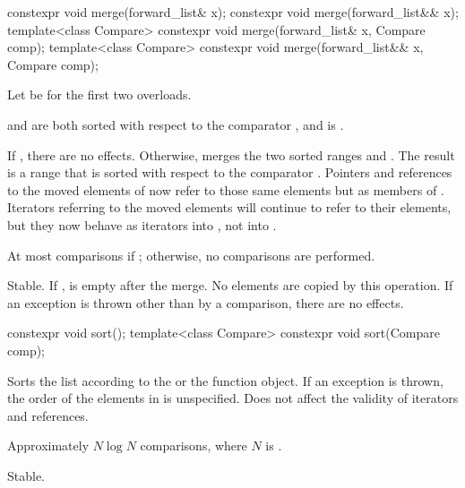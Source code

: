%
\begin{itemdecl}
constexpr void merge(forward_list& x);
constexpr void merge(forward_list&& x);
template<class Compare> constexpr void merge(forward_list& x, Compare comp);
template<class Compare> constexpr void merge(forward_list&& x, Compare comp);
\end{itemdecl}

\begin{itemdescr}
\pnum
Let  be  for the first two overloads.

\pnum
\expects
{} and  are both sorted
with respect to the comparator , and
 is .

\pnum
\effects
If , there are no effects.
Otherwise, merges
the two sorted ranges  and .
The result is a range
that is sorted with respect to the comparator .
Pointers and references to the moved elements of  now refer to those same elements
but as members of . Iterators referring to the moved elements will continue to
refer to their elements, but they now behave as iterators into , not into
.

\pnum
\complexity
At most  comparisons
if ; otherwise, no comparisons are performed.

\pnum
\remarks
Stable.
If ,  is empty after the merge.
No elements are copied by this operation.
If an exception is thrown other than by a comparison, there are no effects.
\end{itemdescr}

%
\begin{itemdecl}
constexpr void sort();
template<class Compare> constexpr void sort(Compare comp);
\end{itemdecl}

\begin{itemdescr}
\pnum
\effects
Sorts the list according to the  or the  function object.
If an exception is thrown, the order of the elements in  is unspecified.
Does not affect the validity of iterators and references.

\pnum
\complexity
Approximately $N \log N$ comparisons, where $N$ is .

\pnum
\remarks
Stable.
\end{itemdescr}

